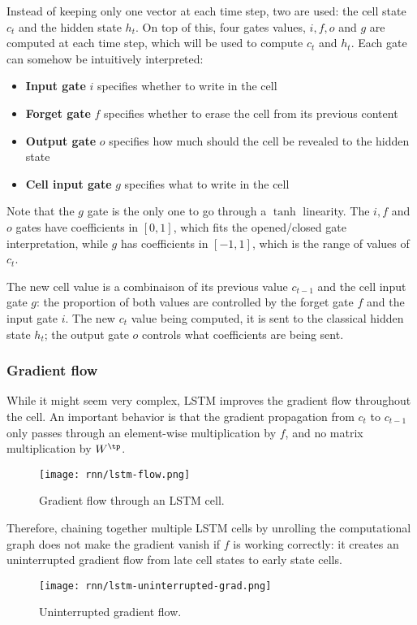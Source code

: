 Instead of keeping only one vector at each time step, two are used: the cell state $c_t$ and the hidden state $h_t$. On top of this, four gates values, $i,f,o$ and $g$ are computed at each time step, which will be used to compute $c_t$ and $h_t$. Each gate can somehow be intuitively interpreted:
\begin{itemize}
    \item \textbf{Input gate} $i$ specifies whether to write in the cell
    \item \textbf{Forget gate} $f$ specifies whether to erase the cell from its previous content
    \item \textbf{Output gate} $o$ specifies how much should the cell be revealed to the hidden state
    \item \textbf{Cell input gate} $g$ specifies what to write in the cell
\end{itemize}
Note that the $g$ gate is the only one to go through a $\tanh$ linearity. The $i,f$ and $o$ gates have coefficients in $[0,1]$, which fits the opened/closed gate interpretation, while $g$ has coefficients in $[-1,1]$, which is the range of values of $c_t$.

The new cell value is a combinaison of its previous value $c_{t-1}$ and the cell input gate $g$: the proportion of both values are controlled by the forget gate $f$ and the input gate $i$. The new $c_t$ value being computed, it is sent to the classical hidden state $h_t$; the output gate $o$ controls what coefficients are being sent.

\subsubsection{Gradient flow}
While it might seem very complex, LSTM improves the gradient flow throughout the cell. An important behavior is that the gradient propagation from $c_t$ to $c_{t-1}$ only passes through an element-wise multiplication by $f$, and no matrix multiplication by $W^\tp$.
\begin{figure}[H]
    \centering
    \texttt{[image: rnn/lstm-flow.png]}
    \caption{Gradient flow through an LSTM cell.}
\end{figure}

Therefore, chaining together multiple LSTM cells by unrolling the computational graph does not make the gradient vanish if $f$ is working correctly: it creates an uninterrupted gradient flow from late cell states to early state cells.
\begin{figure}[H]
    \centering
    \texttt{[image: rnn/lstm-uninterrupted-grad.png]}
    \caption{Uninterrupted gradient flow.}
\end{figure}

